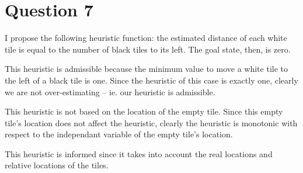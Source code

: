 \documentclass[12pt]{article}
\begin{document}
\section*{Question 7}
I propose the following heuristic function: the estimated distance of each white tile is equal to the number of black tiles to its left. The goal state, then, is zero.

This heuristic is admissible because the minimum value to move a white tile to the left of a black tile is one. Since the heuristic of this case is exactly one, clearly we are not over-estimating -- ie. our heuristic is admissible.

This heuristic is not based on the location of the empty tile. Since this empty tile's location does not affect the heuristic, clearly the heuristic is monotonic with respect to the independant variable of the empty tile's location.

This heuristic is informed since it takes into account the real locations and relative locations of the tiles.
\end{document}
